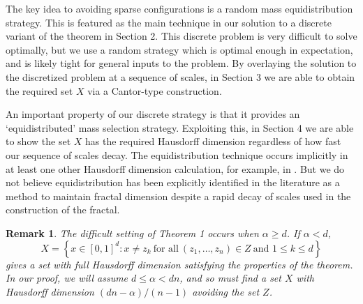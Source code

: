 \documentclass[usenames,dvipsnames]{article}
\theoremstyle{plain}
\theoremstyle{plain}
\newtheorem*{remark}{Remark}
\begin{document}
The key idea to avoiding sparse configurations is a random mass equidistribution strategy. This is featured as the main technique in our solution to a discrete variant of the theorem in Section 2. This discrete problem is very difficult to solve optimally, but we use a random strategy which is optimal enough in expectation, and is likely tight for general inputs to the problem. By overlaying the solution to the discretized problem at a sequence of scales, in Section 3 we are able to obtain the required set $X$ via a Cantor-type construction.

An important property of our discrete strategy is that it provides an `equidistributed' mass selection strategy. Exploiting this, in Section 4 we are able to show the set $X$ has the required Hausdorff dimension regardless of how fast our sequence of scales decay. The equidistribution technique occurs implicitly in at least one other Hausdorff dimension calculation, for example, in \cite{MalabikaRob}. But we do not believe equidistribution has been explicitly identified in the literature as a method to maintain fractal dimension despite a rapid decay of scales used in the construction of the fractal.

\begin{remark}
	The difficult setting of Theorem 1 occurs when $\alpha \geq d$. If $\alpha < d$,
	\[ X = \left\{ x \in [0,1]^d : x \neq z_k\ \text{for all}\ (z_1, \dots, z_n) \in Z\ \text{and $1 \leq k \leq d$} \right\} \]
	gives a set with full Hausdorff dimension satisfying the properties of the theorem. In our proof, we will assume $d \leq \alpha < dn$, and so must find a set $X$ with Hausdorff dimension $(dn - \alpha) / (n - 1)$ avoiding the set $Z$.
\end{remark}


%
\end{document}
